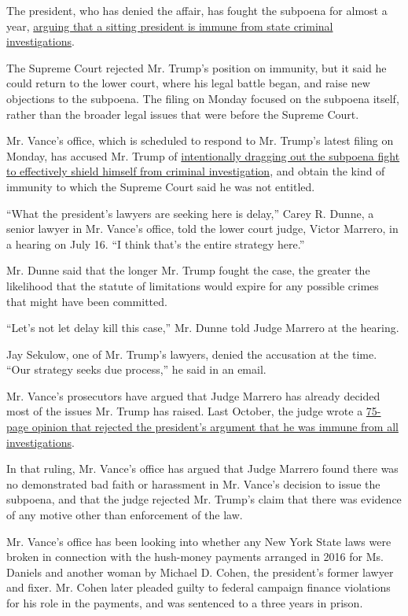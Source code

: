 The president, who has denied the affair, has fought the subpoena for
almost a year,
\href{https://www.nytimes3xbfgragh.onion/2019/09/19/nyregion/trump-tax-returns-lawsuit.html}{arguing
that a sitting president is immune from state criminal investigations}.

The Supreme Court rejected Mr. Trump's position on immunity, but it said
he could return to the lower court, where his legal battle began, and
raise new objections to the subpoena. The filing on Monday focused on
the subpoena itself, rather than the broader legal issues that were
before the Supreme Court.

Mr. Vance's office, which is scheduled to respond to Mr. Trump's latest
filing on Monday, has accused Mr. Trump of
\href{https://www.nytimes3xbfgragh.onion/2020/07/16/nyregion/donald-trump-taxes-cyrus-vance.html}{intentionally
dragging out the subpoena fight to effectively shield himself from
criminal investigation}, and obtain the kind of immunity to which the
Supreme Court said he was not entitled.

``What the president's lawyers are seeking here is delay,'' Carey R.
Dunne, a senior lawyer in Mr. Vance's office, told the lower court
judge, Victor Marrero, in a hearing on July 16. ``I think that's the
entire strategy here.''

Mr. Dunne said that the longer Mr. Trump fought the case, the greater
the likelihood that the statute of limitations would expire for any
possible crimes that might have been committed.

``Let's not let delay kill this case,'' Mr. Dunne told Judge Marrero at
the hearing.

Jay Sekulow, one of Mr. Trump's lawyers, denied the accusation at the
time. ``Our strategy seeks due process,'' he said in an email.

Mr. Vance's prosecutors have argued that Judge Marrero has already
decided most of the issues Mr. Trump has raised. Last October, the judge
wrote a
\href{https://www.nytimes3xbfgragh.onion/2019/10/07/nyregion/trump-taxes-lawsuit-vance.html}{75-page
opinion that rejected the president's argument that he was immune from
all investigations}.

In that ruling, Mr. Vance's office has argued that Judge Marrero found
there was no demonstrated bad faith or harassment in Mr. Vance's
decision to issue the subpoena, and that the judge rejected Mr. Trump's
claim that there was evidence of any motive other than enforcement of
the law.

Mr. Vance's office has been looking into whether any New York State laws
were broken in connection with the hush-money payments arranged in 2016
for Ms. Daniels and another woman by Michael D. Cohen, the president's
former lawyer and fixer. Mr. Cohen later pleaded guilty to federal
campaign finance violations for his role in the payments, and was
sentenced to a three years in prison.


